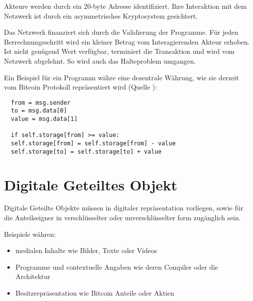 \documentclass[]{article}
\begin{document}
Akteure werden durch ein 20-byte Adresse identifiziert. Ihre Interaktion mit dem Netzwerk ist durch ein asymmetrisches Kryptosystem gesichtert.

Das Netzwerk finanziert sich durch die Validierung der Programme. Für jeden Berrechnungsschritt wird ein kleiner Betrag vom Interagierenden Akteur erhoben. Ist nicht genügend Wert verfügbar, terminiert die Transaktion und wird vom Netzwerk abgelehnt. So wird auch das Halteproblem umgangen.

Ein Beispiel für ein Programm währe eine dezentrale Währung, wie sie derzeit vom Bitcoin Protokoll repräsentiert wird (Quelle \cite{Butterin2014}):




\begin{lstlisting}
  from = msg.sender
  to = msg.data[0]
  value = msg.data[1]

  if self.storage[from] >= value:
  self.storage[from] = self.storage[from] - value
  self.storage[to] = self.storage[to] + value
\end{lstlisting}



\newpage
\section{Digitale Geteiltes Objekt}


Digitale Geteilte Objekte müssen in digitaler repräsentation vorliegen, sowie für die Anteilseigner in verschlüsselter oder unverschlüsselter form zugänglich sein.

Beispiele währen: 

\begin{itemize}
  \item medialen Inhalte wie Bilder, Texte oder Videos
  \item Programme und contextuelle Angaben wie deren Compiler oder die Architektur
  \item Besitzrepräsentation wie Bitcoin Anteile oder Aktien
\end{itemize}
\end{document}
